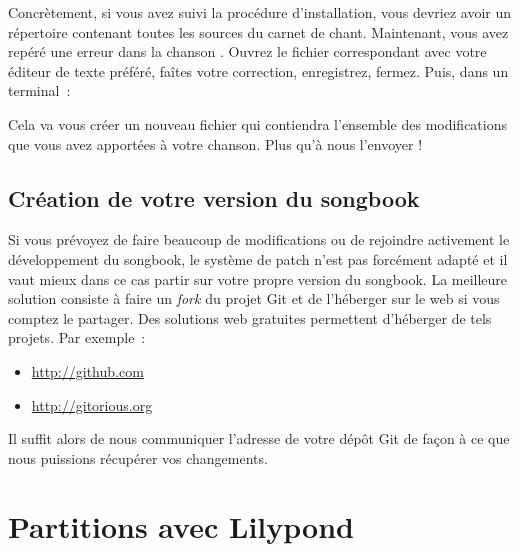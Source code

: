 \documentclass[online]{patacrep}
\begin{document}
Concrètement, si vous avez suivi la procédure d'installation, vous
devriez avoir un répertoire  contenant toutes
les sources du carnet de chant. Maintenant, vous avez repéré une
erreur dans la chanson . Ouvrez le
fichier correspondant avec votre éditeur de texte préféré, faîtes
votre correction, enregistrez, fermez. Puis, dans un terminal~:


Cela va vous créer un nouveau fichier  qui contiendra
l'ensemble des modifications que vous avez apportées à votre
chanson. Plus qu'à nous l'envoyer !

\subsection{Création de votre version du songbook}

Si vous prévoyez de faire beaucoup de modifications ou de rejoindre
activement le développement du songbook, le système de patch n'est pas
forcément adapté et il vaut mieux dans ce cas partir sur votre propre
version du songbook. La meilleure solution consiste à faire un
\emph{fork} du projet Git et de l'héberger sur le web si vous comptez
le partager. Des solutions web gratuites permettent d'héberger de tels
projets. Par exemple~:

\begin{itemize}
\item \url{http://github.com}
\item \url{http://gitorious.org}
\end{itemize}

Il suffit alors de nous communiquer l'adresse de votre dépôt Git de
façon à ce que nous puissions récupérer vos changements.


\section{Partitions avec Lilypond}
\end{document}
